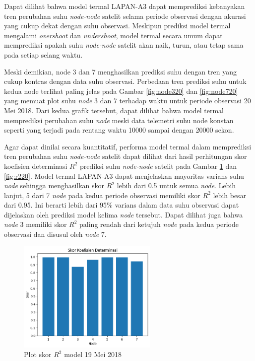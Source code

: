 Dapat dilihat bahwa model termal LAPAN-A3 dapat memprediksi kebanyakan tren
perubahan suhu \textit{node-node} satelit selama periode observasi dengan akurasi yang
cukup dekat dengan suhu observasi. Meskipun prediksi model termal mengalami
\textit{overshoot} dan \textit{undershoot}, model termal secara umum dapat
memprediksi apakah suhu \textit{node-node} satelit akan naik, turun, atau tetap sama
pada setiap selang waktu.

Meski demikian, node 3 dan 7 menghasilkan prediksi suhu
dengan tren yang cukup kontras dengan data suhu observasi. Perbedaan tren
prediksi suhu untuk kedua node terlihat paling jelas pada Gambar \ref{fig:node320}
dan \ref{fig:node720} yang memuat plot suhu \textit{node} 3 dan 7 terhadap waktu untuk
periode observasi 20 Mei 2018. Dari kedua grafik tersebut, dapat dilihat bahwa
model termal memprediksi perubahan suhu \textit{node} meski data telemetri suhu node
konstan seperti yang terjadi pada rentang waktu 10000 sampai dengan 20000
sekon.

Agar dapat dinilai secara kuantitatif, performa model termal dalam memprediksi
tren perubahan suhu \textit{node-node} satelit dapat dilihat dari hasil perhitungan skor koefisien determinasi $R^2$ prediksi suhu \textit{node-node} satelit pada Gambar \ref{fig:r219} dan
\ref{fig:r220}. Model termal LAPAN-A3 dapat menjelaskan mayoritas varians suhu
\textit{node} sehingga menghasilkan skor $R^2$ lebih dari 0.5 untuk semua \textit{node}. Lebih
lanjut, 5 dari 7 \textit{node} pada kedua periode observasi memiliki skor $R^2$ lebih besar dari 0.95. Ini berarti lebih dari 95\%
varians dalam data suhu observasi dapat dijelaskan oleh prediksi model kelima \textit{node} tersebut. Dapat
dilihat juga bahwa \textit{node} 3 memiliki skor $R^2$ paling rendah dari ketujuh \textit{node} pada
kedua periode observasi dan disusul oleh \textit{node} 7.

\begin{figure}[H]
\setlength{}
\begin{center}
\includegraphics[width=0.6\textwidth]{fig/r2_2018-05-19.png}
\caption{Plot skor $R^2$ model 19 Mei 2018}
\label{fig:r219}
\end{center}
\end{figure}

